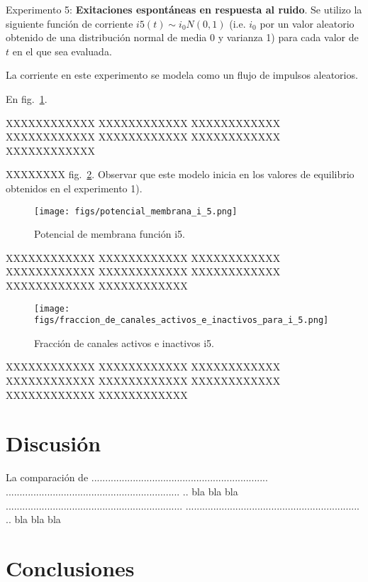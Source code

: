 \documentclass[aps,prl,twocolumn,groupedaddress]{revtex4-2}
\begin{document}
Experimento 5: \textbf{Exitaciones espontáneas en respuesta al ruido}. Se utilizo la siguiente función de corriente $i5(t)\sim i_0 N(0,1)$ (i.e. $i_0$ por un valor aleatorio obtenido de una distribución normal de media 0 y varianza 1) para cada valor de $t$ en el que sea evaluada.

La corriente en este experimento se modela como un flujo de impulsos aleatorios.

En fig.~\ref{fig9}.


XXXXXXXXXXXX
XXXXXXXXXXXX
XXXXXXXXXXXX
XXXXXXXXXXXX
XXXXXXXXXXXX
XXXXXXXXXXXX
XXXXXXXXXXXX

XXXXXXXX  fig.~\ref{fig10}.
Observar que este modelo inicia en los valores de equilibrio obtenidos en el experimento 1).




\begin{figure}[h!]
\centering
\texttt{[image: figs/potencial\_membrana\_i\_5.png]}
\caption{Potencial de membrana función i5. \label{fig9}}
\end{figure}



XXXXXXXXXXXX
XXXXXXXXXXXX
XXXXXXXXXXXX
XXXXXXXXXXXX
XXXXXXXXXXXX
XXXXXXXXXXXX
XXXXXXXXXXXX
XXXXXXXXXXXX



\begin{figure}[h!]
\centering
\texttt{[image: figs/fraccion\_de\_canales\_activos\_e\_inactivos\_para\_i\_5.png]}
\caption{Fracción de canales activos e inactivos i5. \label{fig10}}
\end{figure}



XXXXXXXXXXXX
XXXXXXXXXXXX
XXXXXXXXXXXX
XXXXXXXXXXXX
XXXXXXXXXXXX
XXXXXXXXXXXX
XXXXXXXXXXXX
XXXXXXXXXXXX



\section{Discusión}

La comparación de ................................................................
...............................................................
.. bla bla bla ................................................................
...............................................................
.. bla bla bla

\section{Conclusiones}
\end{document}
